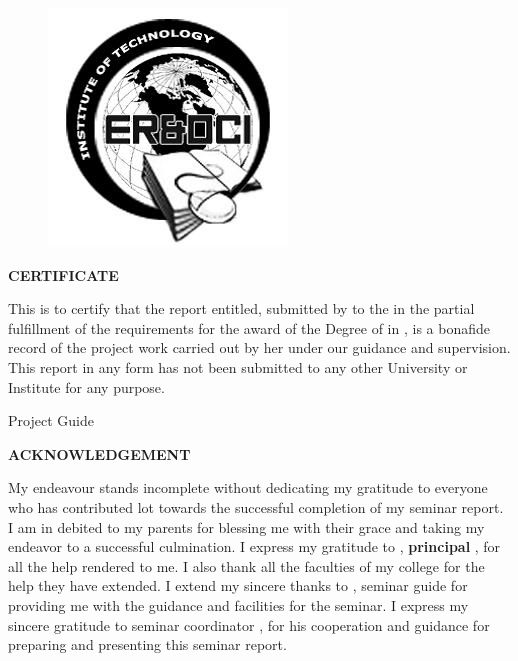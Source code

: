 \documentclass[12pt,a4paper]{report}
\begin{document}

\newpage
\thispagestyle{empty}
\begin{center}
{\insti{}}

\begin{figure}[ht]
\centering
\includegraphics[scale=0.5]{logo}
\end{figure}
{\large{\textbf{CERTIFICATE}}}

\end{center}

This is to certify that the report entitled,\textbf{ \projectname{}} submitted by \textbf{\stud{}} to the \uni{} in the partial fulfillment of the requirements for the award of the Degree of \degree{} in \stream{}, \depts{} is a bonafide record of the project work carried out by her under our guidance and supervision. This report in any form has not been submitted to any other University or Institute for any purpose.
\vspace{25mm}
 \\         
\begin{flushright} Project Guide \end{flushright} 
                                                                                     

\newpage
{}
\begin{center}
\textbf{ACKNOWLEDGEMENT}
\end{center} 
My endeavour stands incomplete without dedicating my gratitude to everyone who has
contributed lot towards the successful completion of my seminar report. I am in debited
to my parents for blessing me with their grace and taking my endeavor to a successful
culmination. I express my gratitude to \textbf{\guide{}}, \textbf{principal \prince{}}, \instis{} for all the help rendered
to me. I also thank all the faculties of my college for the help they have extended. I
extend my sincere thanks to \textbf{\guide{}}, seminar guide for providing me with the guidance and facilities for the seminar. I
express my sincere gratitude to seminar coordinator \textbf{\coord{}}, for his cooperation and guidance for preparing and presenting this seminar
report.
 
\end{document}
